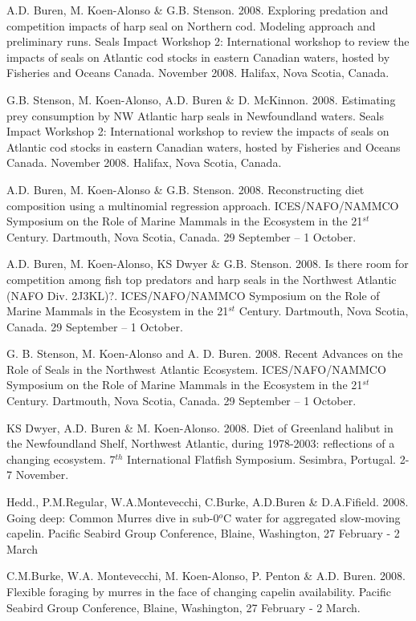 \documentclass{res}
\begin{document}
\begin{resume}
\begin{hangparas}{.4in}{1}
A.D. Buren, M. Koen-Alonso \& G.B. Stenson. 2008. Exploring predation and competition impacts of harp seal on Northern cod. Modeling approach and preliminary runs. Seals Impact Workshop 2: International workshop to review the impacts of seals on Atlantic cod stocks in eastern Canadian waters, hosted by Fisheries and Oceans Canada. November 2008. Halifax, Nova Scotia, Canada.

G.B. Stenson, M. Koen-Alonso, A.D. Buren \& D. McKinnon. 2008. Estimating prey consumption by NW Atlantic harp seals in Newfoundland waters. Seals Impact Workshop 2: International workshop to review the impacts of seals on Atlantic cod stocks in eastern Canadian waters, hosted by Fisheries and Oceans Canada. November 2008. Halifax, Nova Scotia, Canada.

A.D. Buren, M. Koen-Alonso \& G.B. Stenson. 2008. Reconstructing diet composition using a multinomial regression approach. ICES/NAFO/NAMMCO Symposium on the Role of Marine Mammals in the Ecosystem in the 21$^{st}$ Century. Dartmouth, Nova Scotia, Canada. 29 September – 1 October.

\pagebreak
A.D. Buren, M. Koen-Alonso, KS Dwyer \& G.B. Stenson. 2008. Is there room for competition among fish top predators and harp seals in the Northwest Atlantic (NAFO Div. 2J3KL)?. ICES/NAFO/NAMMCO Symposium on the Role of Marine Mammals in the Ecosystem in the 21$^{st}$ Century. Dartmouth, Nova Scotia, Canada. 29 September – 1 October.

G. B. Stenson, M. Koen-Alonso and A. D. Buren. 2008. Recent Advances on the Role of Seals in the Northwest Atlantic Ecosystem. ICES/NAFO/NAMMCO Symposium on the Role of Marine Mammals in the Ecosystem in the 21$^{st}$ Century. Dartmouth, Nova Scotia, Canada. 29 September – 1 October.

KS Dwyer, A.D. Buren \& M. Koen-Alonso. 2008. Diet of Greenland halibut in the Newfoundland Shelf, Northwest Atlantic, during 1978-2003: reflections of a changing ecosystem. 7$^{th}$ International Flatfish Symposium. Sesimbra, Portugal. 2-7 November.

Hedd., P.M.Regular, W.A.Montevecchi, C.Burke, A.D.Buren \& D.A.Fifield. 2008. Going deep: Common Murres dive in sub-0$^{o}$C water for aggregated slow-moving capelin. Pacific Seabird Group Conference, Blaine, Washington, 27 February - 2 March

C.M.Burke, W.A. Montevecchi, M. Koen-Alonso, P. Penton \& A.D. Buren. 2008. Flexible foraging by murres in the face of changing capelin availability. Pacific Seabird Group Conference, Blaine, Washington, 27 February - 2 March.


\end{hangparas}
\end{resume}
\end{document}
